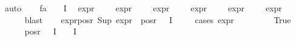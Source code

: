 \begin{isabellebody}
\ auto\isanewline
\ \ \isamarkupfalse%
\ fa{\isacharunderscore}{\kern0pt}{\isasympsi}{\isacharcolon}{\kern0pt}\ {\isachardoublequoteopen}{\isasymforall}{\isasympsi}{\isasymin}\ {\isacharparenleft}{\kern0pt}{\isasymPhi}\ {\isacharbackquote}{\kern0pt}\ I{\isacharparenright}{\kern0pt}\ {\isacharminus}{\kern0pt}\ {\isacharbraceleft}{\kern0pt}{\isasymphi}{\isacharbraceright}{\kern0pt}{\isachardot}{\kern0pt}\isanewline
expr{\isacharunderscore}{\kern0pt}{}\ {\isasympsi}\ {\isasymle}\ {}\ {\isasymand}\ expr{\isacharunderscore}{\kern0pt}{}\ {\isasympsi}\ {\isasymle}\ {\isasyminfinity}\ {\isasymand}\ expr{\isacharunderscore}{\kern0pt}{}\ {\isasympsi}\ {\isasymle}\ {}\ {\isasymand}\ expr{\isacharunderscore}{\kern0pt}{}\ {\isasympsi}\ {\isasymle}\ {}\ {\isasymand}\ expr{\isacharunderscore}{\kern0pt}{}\ {\isasympsi}\ {\isasymle}\ {}\ {\isasymand}\ expr{\isacharunderscore}{\kern0pt}{}\ {\isasympsi}\ {\isasymle}\ {}{\isachardoublequoteclose}\isanewline
\ \ \ \ \isamarkupfalse%
\ blast\isanewline
\isanewline
\ \ \isamarkupfalse%
\ expr{\isacharunderscore}{\kern0pt}{}{\isacharunderscore}{\kern0pt}pos{\isacharunderscore}{\kern0pt}r{\isacharcolon}{\kern0pt}\ {\isachardoublequoteopen}Sup\ {\isacharparenleft}{\kern0pt}expr{\isacharunderscore}{\kern0pt}{}\ {\isacharbackquote}{\kern0pt}\ {\isacharparenleft}{\kern0pt}pos{\isacharunderscore}{\kern0pt}r\ {\isacharparenleft}{\kern0pt}{\isasymPhi}\ {\isacharbackquote}{\kern0pt}\ I{\isacharparenright}{\kern0pt}{\isacharparenright}{\kern0pt}{\isacharparenright}{\kern0pt}\ {\isasymle}\ {}{\isachardoublequoteclose}\isanewline
\ \ \isamarkupfalse%
{\isacharparenleft}{\kern0pt}cases\ {\isachardoublequoteopen}expr{\isacharunderscore}{\kern0pt}{}\ {\isasymphi}\ {\isasymge}\ {}{\isachardoublequoteclose}{\isacharparenright}{\kern0pt}\isanewline
\ \ \ \ \isamarkupfalse%
\ True\isanewline
\ \ \ \ \isamarkupfalse%
\ {\isachardoublequoteopen}pos{\isacharunderscore}{\kern0pt}r\ {\isacharparenleft}{\kern0pt}{\isasymPhi}\ {\isacharbackquote}{\kern0pt}\ I{\isacharparenright}{\kern0pt}\ {\isacharequal}{\kern0pt}\ {\isacharparenleft}{\kern0pt}{\isasymPhi}\ {\isacharbackquote}{\kern0pt}\ I{\isacharparenright}{\kern0pt}\ {\isacharminus}{\kern0pt}\ {\isacharbraceleft}{\kern0pt}{\isasymphi}{\isacharbraceright}{\kern0pt}{\isachardoublequoteclose}\isanewline
\ \ \isamarkupfalse%

\end{isabellebody}
